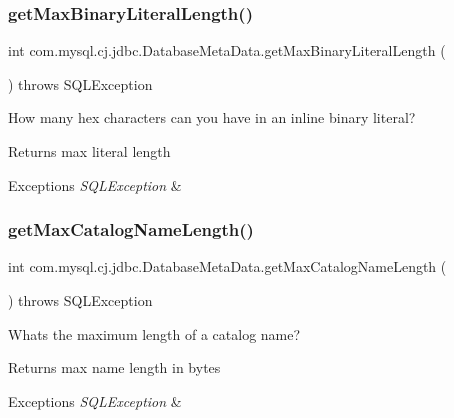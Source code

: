 \subsubsection{\texorpdfstring{get\+Max\+Binary\+Literal\+Length()}{getMaxBinaryLiteralLength()}}
{\footnotesize\ttfamily int com.\+mysql.\+cj.\+jdbc.\+Database\+Meta\+Data.\+get\+Max\+Binary\+Literal\+Length (\begin{DoxyParamCaption}{ }\end{DoxyParamCaption}) throws S\+Q\+L\+Exception}

How many hex characters can you have in an inline binary literal?

\begin{DoxyReturn}{Returns}
max literal length 
\end{DoxyReturn}

\begin{DoxyExceptions}{Exceptions}
{\em S\+Q\+L\+Exception} & \\
\hline
\end{DoxyExceptions}
\mbox{\label{classcom_1_1mysql_1_1cj_1_1jdbc_1_1_database_meta_data_a0bbcea8aa06a9b1953a31c5e82806bb4}} 
\subsubsection{\texorpdfstring{get\+Max\+Catalog\+Name\+Length()}{getMaxCatalogNameLength()}}
{\footnotesize\ttfamily int com.\+mysql.\+cj.\+jdbc.\+Database\+Meta\+Data.\+get\+Max\+Catalog\+Name\+Length (\begin{DoxyParamCaption}{ }\end{DoxyParamCaption}) throws S\+Q\+L\+Exception}

What\textquotesingle{}s the maximum length of a catalog name?

\begin{DoxyReturn}{Returns}
max name length in bytes 
\end{DoxyReturn}

\begin{DoxyExceptions}{Exceptions}
{\em S\+Q\+L\+Exception} & \\
\hline
\end{DoxyExceptions}
\mbox{\label{classcom_1_1mysql_1_1cj_1_1jdbc_1_1_database_meta_data_a8b9912f9db39e22957f00881a17d69fe}} 
